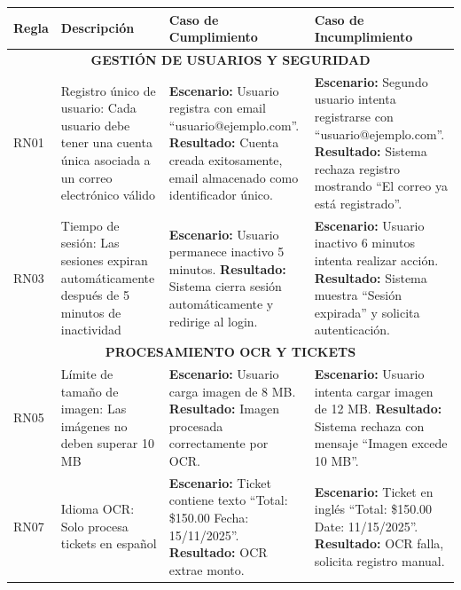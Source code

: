 \begin{table}[H]
\centering
\tiny
\renewcommand{\arraystretch}{1.1}
\begin{tabular}{|p{1.2cm}|p{3.5cm}|p{4cm}|p{4cm}|}
\hline
\textbf{Regla} & \textbf{Descripción} & \textbf{Caso de Cumplimiento} & \textbf{Caso de Incumplimiento} \\
\hline
\hline

\multicolumn{4}{|c|}{\textbf{GESTIÓN DE USUARIOS Y SEGURIDAD}} \\
\hline

RN01 & Registro único de usuario: Cada usuario debe tener una cuenta única asociada a un correo electrónico válido & 
\textbf{Escenario:} Usuario registra con email ``usuario@ejemplo.com''. \newline
\textbf{Resultado:} Cuenta creada exitosamente, email almacenado como identificador único. &
\textbf{Escenario:} Segundo usuario intenta registrarse con ``usuario@ejemplo.com''. \newline
\textbf{Resultado:} Sistema rechaza registro mostrando ``El correo ya está registrado''. \\
\hline

RN03 & Tiempo de sesión: Las sesiones expiran automáticamente después de 5 minutos de inactividad & 
\textbf{Escenario:} Usuario permanece inactivo 5 minutos. \newline
\textbf{Resultado:} Sistema cierra sesión automáticamente y redirige al login. &
\textbf{Escenario:} Usuario inactivo 6 minutos intenta realizar acción. \newline
\textbf{Resultado:} Sistema muestra ``Sesión expirada'' y solicita autenticación. \\
\hline

\hline
\multicolumn{4}{|c|}{\textbf{PROCESAMIENTO OCR Y TICKETS}} \\
\hline

RN05 & Límite de tamaño de imagen: Las imágenes no deben superar 10 MB & 
\textbf{Escenario:} Usuario carga imagen de 8 MB. \newline
\textbf{Resultado:} Imagen procesada correctamente por OCR. &
\textbf{Escenario:} Usuario intenta cargar imagen de 12 MB. \newline
\textbf{Resultado:} Sistema rechaza con mensaje ``Imagen excede 10 MB''. \\
\hline

RN07 & Idioma OCR: Solo procesa tickets en español & 
\textbf{Escenario:} Ticket contiene texto ``Total: \$150.00 Fecha: 15/11/2025''. \newline
\textbf{Resultado:} OCR extrae monto. &
\textbf{Escenario:} Ticket en inglés ``Total: \$150.00 Date: 11/15/2025''. \newline
\textbf{Resultado:} OCR falla, solicita registro manual. \\
\hline


\end{tabular}
\end{table}
